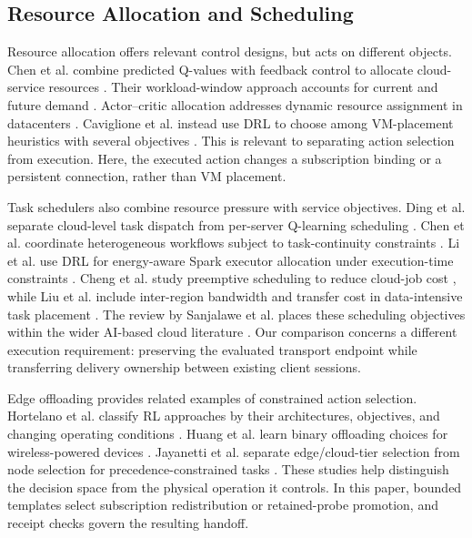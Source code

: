 
\subsection{Resource Allocation and Scheduling}

Resource allocation offers relevant control designs, but acts on different
objects. Chen et al. combine predicted Q-values with feedback control to
allocate cloud-service resources \cite{Chen2022RLFeedback}. Their
workload-window approach accounts for current and future demand
\cite{Chen2023WorkloadWindows}. Actor--critic allocation addresses dynamic
resource assignment in datacenters \cite{Chen2022ActorCritic}. Caviglione
et al. instead use DRL to choose among VM-placement heuristics with several
objectives \cite{Caviglione2021VMPlacement}. This is relevant to separating
action selection from execution. Here, the executed action changes a
subscription binding or a persistent connection, rather than VM placement.

Task schedulers also combine resource pressure with service objectives.
Ding et al. separate cloud-level task dispatch from per-server Q-learning
scheduling \cite{Ding2020QLearningCloud}. Chen et al. coordinate heterogeneous
workflows subject to task-continuity constraints
\cite{Chen2023CollaborativeScheduling}. Li et al. use DRL for energy-aware
Spark executor allocation under execution-time constraints
\cite{Li2023SparkDRL}. Cheng et al. study preemptive scheduling to reduce
cloud-job cost \cite{Cheng2023PreemptiveCloud}, while Liu et al. include
inter-region bandwidth and transfer cost in data-intensive task placement
\cite{Liu2026GeoDRL}. The review by Sanjalawe et al. places these scheduling
objectives within the wider AI-based cloud literature
\cite{Sanjalawe2025AIJobScheduling}. Our comparison concerns a different
execution requirement: preserving the evaluated transport endpoint while
transferring delivery ownership between existing client sessions.

Edge offloading provides related examples of constrained action selection.
Hortelano et al. classify RL approaches by their architectures, objectives,
and changing operating conditions \cite{Hortelano2023RLOffloading}. Huang
et al. learn binary offloading choices for wireless-powered devices
\cite{Huang2020Offloading}. Jayanetti et al. separate edge/cloud-tier selection
from node selection for precedence-constrained tasks
\cite{Jayanetti2022EdgeCloudScheduling}. These studies help distinguish the
decision space from the physical operation it controls. In this paper,
bounded templates select subscription redistribution or retained-probe
promotion, and receipt checks govern the resulting handoff.

